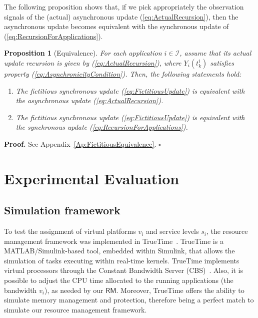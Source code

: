 \documentclass[letter,11pt]{article}
\newtheorem{proposition}{Proposition}[section]
\newenvironment{proof}{\textbf{Proof.}}{$\square$\\}
\begin{document}
The following proposition shows that, if we pick appropriately the observation signals of the (actual) asynchronous update (\ref{eq:ActualRecursion}), then the asynchronous update becomes equivalent with the synchronous update of (\ref{eq:RecursionForApplications}).

\begin{proposition}[Equivalence] \label{Pr:FictitiousEquivalence} 
  For each application $i\in\mathcal{I}$, assume that its actual update recursion is given by (\ref{eq:ActualRecursion}), where $Y_{i}(t^i_k)$ satisfies property (\ref{eq:AsynchronicityCondition}). 
  Then, the following statements hold:
  \begin{enumerate}
  \item The fictitious synchronous update (\ref{eq:FictitiousUpdate}) is equivalent with the asynchronous update (\ref{eq:ActualRecursion}).
  \item The fictitious synchronous update (\ref{eq:FictitiousUpdate}) is equivalent with the synchronous update (\ref{eq:RecursionForApplications}).
  \end{enumerate}
\end{proposition}
\begin{proof}
  See Appendix~\ref{Ap:FictitiousEquivalence}.
\end{proof}

\section{Experimental Evaluation}
\label{sec:expsim}

\subsection{Simulation framework}
\label{sec:implementation}

To test the assignment of virtual platforms $v_i$ and service levels $s_i$, the resource management framework was implemented in TrueTime~\cite{cer03}. TrueTime is a MATLAB/Simulink-based tool, embedded within Simulink, that allows the simulation of tasks executing within real-time kernels.
TrueTime implements virtual processors through the Constant Bandwidth Server (CBS)~\cite{Abe98a}. Also, it is possible to adjust the CPU time allocated to the running applications (the bandwidth $v_i$), as needed by our {$\mathsf{RM}$}.
Moreover, TrueTime offers the ability to simulate memory management and protection, therefore being a perfect match to simulate our resource management framework.
\end{document}

